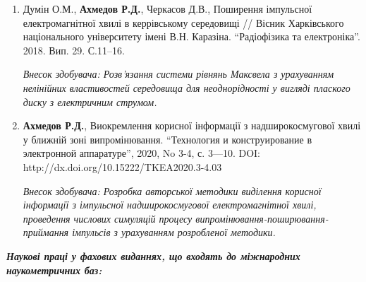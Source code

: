 {\begin{enumerate}
		\item Думін О.М., \textbf{Ахмедов Р.Д.}, Черкасов Д.В., Поширення імпульсної 
		електромагнітної хвилі в керрівському середовищі // Вісник Харківського 
		національного університету імені В.Н. Каразіна. ``Радіофізика та 
		електроніка''. 2018. Вип. 29. С.11--16.
		
		\textit{Внесок здобувача: Розв'язання системи рівнянь Максвела з урахуванням
			нелінійних властивостей середовища для неоднорідності у вигляді плаского 
			диску з електричним струмом.}
		
		\item \textbf{Ахмедов Р.Д.}, Виокремлення корисної інформації з 
		надширокосмугової хвилі у ближній зоні випромінювання. ``Технология и 
		конструирование в электронной аппаратуре'', 2020, No 3-4, с. 3—10. DOI: 
		http://dx.doi.org/10.15222/TKEA2020.3-4.03
		
		\textit{Внесок здобувача: Розробка авторської методики виділення корисної 
			інформації з імпульсної надширокосмугової електромагнітної хвилі, проведення 
			числових симуляцій процесу випромінювання-поширювання-приймання імпульсів з
			урахуванням розробленої методики.}
		
		\setcounter{ItemsInMyWriting}{\value{enumi}}
	\end{enumerate}
	
%		
%		
%		
%		
		
	\begin{center} 
		\textit{\textbf{Наукові праці у фахових виданнях, що входять до 
				міжнародних наукометричних баз:}}
	\end{center}
	
	\begin{enumerate}
		\setcounter{enumi}{\value{ItemsInMyWriting}}
		

\end{enumerate}}
